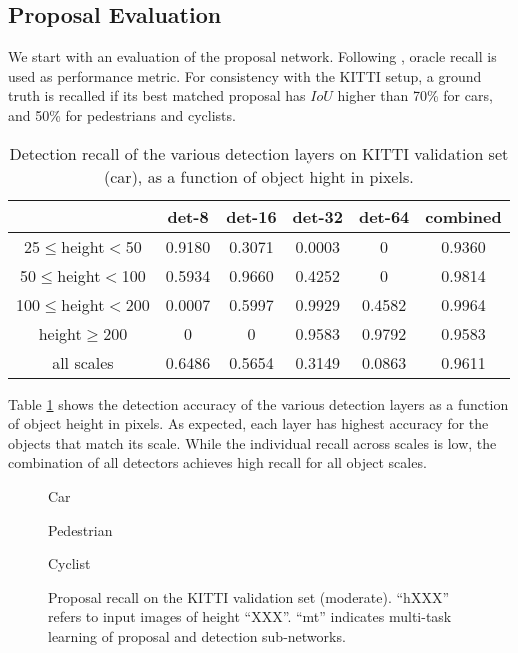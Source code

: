 \documentclass[runningheads]{llncs}
\begin{document}
\subsection{Proposal Evaluation}

We start with an evaluation of the proposal network. Following
\cite{DBLP:journals/pami/Hosang2015Pami}, oracle recall is used as
performance metric. For consistency with the KITTI setup, a ground truth
is recalled if its best matched proposal has $IoU$ higher than 70\% for
cars, and 50\% for pedestrians and cyclists.

\begin{table}[t]
\centering \scriptsize \setlength{\tabcolsep}{3.0pt}
\vspace{0.1cm} \caption{Detection recall of the various detection layers on
  KITTI validation set (car), as a function of object hight in pixels.}
\label{tab:layer compraison}
\begin{tabular}
{c||c|c|c|c|c}
\multirow{2}{*}{}
&det-8 &det-16 &det-32 &det-64 &combined \\\hline\hline
25$\leq$height$<$50     &0.9180 &0.3071  &0.0003  &0      &0.9360\\
50$\leq$height$<$100    &0.5934 &0.9660  &0.4252  &0      &0.9814\\
100$\leq$height$<$200   &0.0007 &0.5997  &0.9929  &0.4582 &0.9964\\
height$\geq$200         &0      &0       &0.9583  &0.9792 &0.9583\\\hline
all scales              &0.6486 &0.5654  &0.3149  &0.0863 &0.9611\\\hline
\end{tabular}
\end{table}

Table \ref{tab:layer compraison} shows the detection accuracy of the
various detection layers as a function of object height in pixels.
As expected, each layer has highest accuracy for the objects
that match its scale. While the individual recall across scales is low,
the combination of all detectors achieves high recall for all object
scales.


\begin{figure*}[!t]
\begin{minipage}[b]{.32\linewidth}
\centering
\centerline{}{Car}
\end{minipage}
\hfill
\begin{minipage}[b]{.32\linewidth}
\centering
\centerline{}{Pedestrian}
\end{minipage}
\hfill
\begin{minipage}[b]{.32\linewidth}
\centering
\centerline{}{Cyclist}
\end{minipage}
\caption{Proposal recall on the KITTI validation set (moderate).
``hXXX'' refers to input images of height ``XXX''. ``mt'' indicates
multi-task learning of proposal and detection sub-networks.}
\label{fig:mt sz comp}
\end{figure*}
\end{document}

